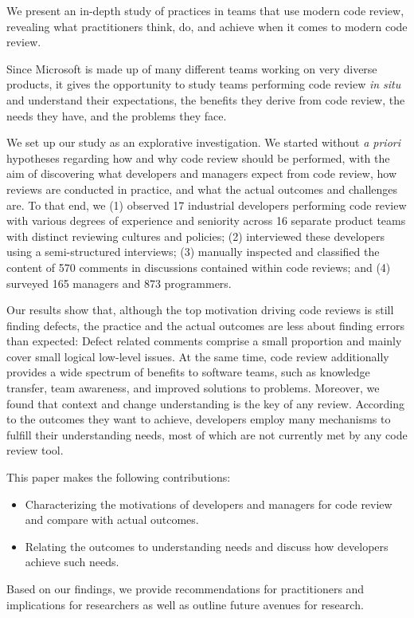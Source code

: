 We present an in-depth study of practices in teams that use modern code review,
revealing what practitioners think, do, and achieve when it comes to modern
code review.

Since Microsoft is made up of many different teams working on very diverse
products, it gives the opportunity to study teams performing code review \emph{in
situ} and understand their expectations, the benefits they derive from code
review, the needs they have, and the problems they face.

We set up our study as an explorative investigation. We started without \emph{a
priori} hypotheses regarding how and why code review should be performed, with
the aim of discovering what developers and managers expect from code review,
how reviews are conducted in practice, and what the actual outcomes and
challenges are. To that end, we (1) observed 17 industrial developers
performing code review with various degrees of experience and seniority across
16 separate product teams with distinct reviewing cultures and policies; (2)
interviewed these developers using a semi-structured interviews; (3) manually
inspected and classified the content of 570 comments in discussions contained
within code reviews; and (4) surveyed 165 managers and 873 programmers.

Our results show that, although the top motivation driving code reviews is
still finding defects, the practice and the actual outcomes are less about
finding errors than expected: Defect related comments comprise a small
proportion and mainly cover small logical low-level issues. At the same time,
code review additionally provides a wide spectrum of benefits to software
teams, such as knowledge transfer, team awareness, and improved solutions to
problems. Moreover, we found that context and change understanding is the key
of any review. According to the outcomes they want to achieve, developers
employ many mechanisms to fulfill their understanding needs, most of which are
not currently met by any code review tool.

This paper makes the following contributions:
\begin{itemize}
  \item Characterizing the motivations of developers and managers for code review and compare with actual outcomes.
  \item Relating the outcomes to understanding needs and discuss how developers achieve such needs.
\end{itemize}

Based on our findings, we provide recommendations for practitioners and
implications for researchers as well as outline future avenues for research.